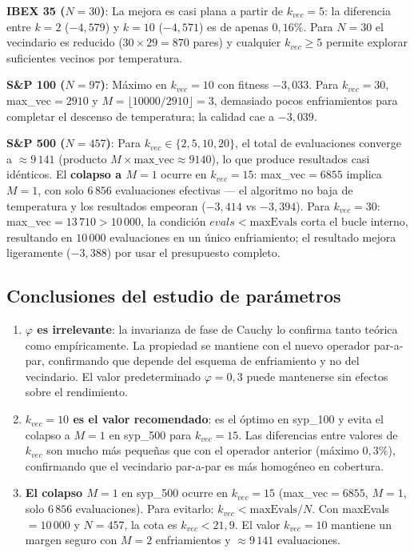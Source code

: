 \documentclass[12pt,a4paper]{article}
\begin{document}
\textbf{IBEX 35 ($N=30$)}: La mejora es casi plana a partir de $k_{vec}=5$: la diferencia
entre $k=2$ ($-4{,}579$) y $k=10$ ($-4{,}571$) es de apenas $0{,}16\%$. Para $N=30$
el vecindario es reducido ($30\times29=870$ pares) y cualquier $k_{vec}\geq5$ permite
explorar suficientes vecinos por temperatura.

\textbf{S\&P 100 ($N=97$)}: Máximo en $k_{vec}=10$ con fitness $-3{,}033$. Para
$k_{vec}=30$, max\_vec$=2910$ y $M=\lfloor 10000/2910\rfloor=3$, demasiado pocos
enfriamientos para completar el descenso de temperatura; la calidad cae a $-3{,}039$.

\textbf{S\&P 500 ($N=457$)}: Para $k_{vec}\in\{2,5,10,20\}$, el total de evaluaciones
converge a $\approx 9\,141$ (producto $M\times\text{max\_vec}\approx 9140$), lo que
produce resultados casi idénticos. El \textbf{colapso a $M=1$} ocurre en $k_{vec}=15$:
max\_vec$=6855$ implica $M=1$, con solo $6\,856$ evaluaciones efectivas — el algoritmo
no baja de temperatura y los resultados empeoran ($-3{,}414$ vs $-3{,}394$). Para
$k_{vec}=30$: max\_vec$=13\,710>10\,000$, la condición $evals<\text{maxEvals}$ corta
el bucle interno, resultando en $10\,000$ evaluaciones en un único enfriamiento; el
resultado mejora ligeramente ($-3{,}388$) por usar el presupuesto completo.

\subsection{Conclusiones del estudio de parámetros}

\begin{enumerate}
  \item \textbf{$\varphi$ es irrelevante}: la invarianza de fase de Cauchy lo confirma
  tanto teórica como empíricamente. La propiedad se mantiene con el nuevo operador
  par-a-par, confirmando que depende del esquema de enfriamiento y no del vecindario.
  El valor predeterminado $\varphi=0{,}3$ puede mantenerse sin efectos sobre el rendimiento.

  \item \textbf{$k_{vec}=10$ es el valor recomendado}: es el óptimo en syp\_100 y
  evita el colapso a $M=1$ en syp\_500 para $k_{vec}=15$. Las diferencias entre
  valores de $k_{vec}$ son mucho más pequeñas que con el operador anterior (máximo $0{,}3\%$),
  confirmando que el vecindario par-a-par es más homogéneo en cobertura.

  \item \textbf{El colapso $M=1$} en syp\_500 ocurre en $k_{vec}=15$ (max\_vec$=6855$,
  $M=1$, solo $6\,856$ evaluaciones). Para evitarlo: $k_{vec} < \text{maxEvals}/N$.
  Con maxEvals$=10\,000$ y $N=457$, la cota es $k_{vec}<21{,}9$. El valor $k_{vec}=10$
  mantiene un margen seguro con $M=2$ enfriamientos y $\approx 9\,141$ evaluaciones.
\end{enumerate}
\end{document}
